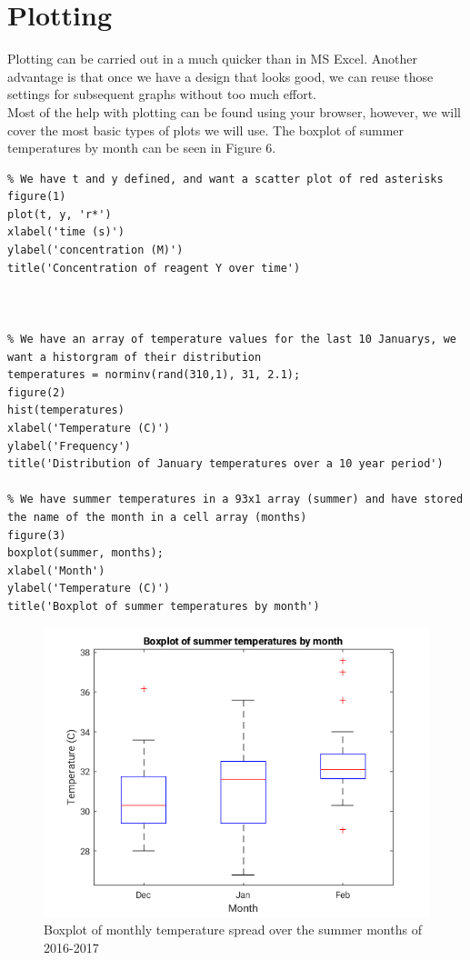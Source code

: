 \documentclass[12pt]{article}
\begin{document}
\section{Plotting}
Plotting can be carried out in a much quicker than in MS Excel. Another advantage is that once we have a design that looks good, we can reuse those settings for subsequent graphs without too much effort.\\
Most of the help with plotting can be found using your browser, however, we will cover the most basic types of plots we will use. The boxplot of summer temperatures by month can be seen in Figure 6.

\begin{lstlisting}
% We have t and y defined, and want a scatter plot of red asterisks
figure(1)
plot(t, y, 'r*')
xlabel('time (s)')
ylabel('concentration (M)')
title('Concentration of reagent Y over time')



% We have an array of temperature values for the last 10 Januarys, we want a historgram of their distribution
temperatures = norminv(rand(310,1), 31, 2.1);
figure(2)
hist(temperatures)
xlabel('Temperature (C)')
ylabel('Frequency')
title('Distribution of January temperatures over a 10 year period')

% We have summer temperatures in a 93x1 array (summer) and have stored the name of the month in a cell array (months)
figure(3)
boxplot(summer, months);
xlabel('Month')
ylabel('Temperature (C)')
title('Boxplot of summer temperatures by month')

\end{lstlisting}

\begin{figure}[ht]
\centering
\label{fig:boxplot}
\includegraphics[scale=0.8]{boxplot.png}
\caption{Boxplot of monthly temperature spread over the summer months of 2016-2017}
\end{figure}
\end{document}
